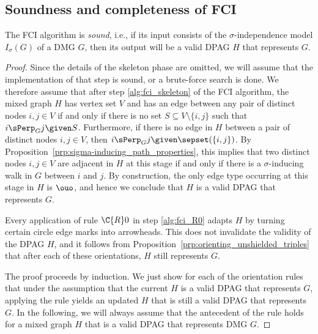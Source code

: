 \subsection{Soundness and completeness of FCI}

\begin{Thm}\label{thm:fci_sound}
  The FCI algorithm is \emph{sound}, i.e., if its input consists of the $\sigma$-independence model $I_\sigma(G)$ of a DMG $G$, then its output will be a valid DPAG $H$ that represents $G$.
\end{Thm}
\begin{proof}
  Since the details of the skeleton phase are omitted, we will assume that the implementation of that step is sound, or a brute-force search is done.
  We therefore assume that after step \ref{alg:fci_skeleton} of the FCI algorithm, the mixed graph $H$ has vertex set $V$ and has an edge between any pair of distinct nodes $i,j \in V$ if and only if there is no set $S \subseteq V \setminus \{i,j\}$ such that $i \sPerp_G j \given S$.
  Furthermore, if there is no edge in $H$ between a pair of distinct nodes $i,j \in V$, then $i \sPerp_G j \given \sepset(\{i,j\})$.
  By Proposition~\ref{prp:sigma-inducing_path_properties}, this implies that two distinct nodes $i,j \in V$ are adjacent in $H$ at this stage if and only if there is a $\sigma$-inducing walk in $G$ between $i$ and $j$.
  By construction, the only edge type occurring at this stage in $H$ is $\ouo$, and hence we conclude that $H$ is a valid DPAG that represents $G$. 

  Every application of rule $\C{R}0$ in step \ref{alg:fci_R0} adapts $H$ by turning certain circle edge marks into arrowheads.
  This does not invalidate the validity of the DPAG $H$, and it follows from Proposition~\ref{prp:orienting_unshielded_triples} that after each of these orientations, $H$ still represents $G$.

  The proof proceeds by induction.
  We just show for each of the orientation rules that under the assumption that the current $H$ is a valid DPAG that represents $G$, applying the rule yields an updated $H$ that is still a valid DPAG that represents $G$.
  In the following, we will always assume that the antecedent of the rule holds for a mixed graph $H$ that is a valid DPAG that represents DMG $G$.


\end{proof}
